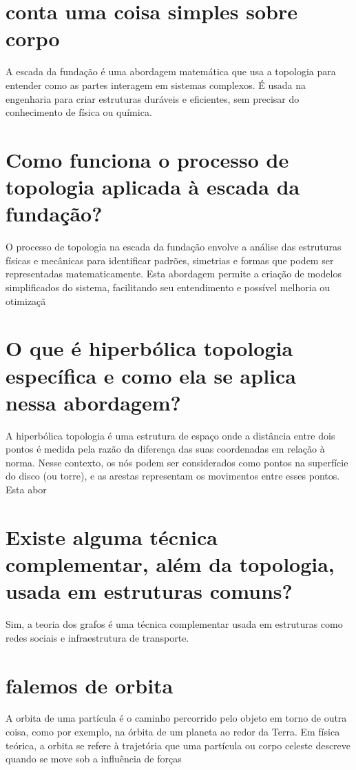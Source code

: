 \documentclass[11pt,a4paper]{article}
\begin{document}
\section{conta uma coisa simples sobre corpo}
A escada da fundação é uma abordagem matemática que usa a topologia para entender como as partes interagem em sistemas complexos. É usada na engenharia para criar estruturas duráveis e eficientes, sem precisar do conhecimento de física ou química.

\section{Como funciona o processo de topologia aplicada à escada da fundação?}
O processo de topologia na escada da fundação envolve a análise das estruturas físicas e mecânicas para identificar padrões, simetrias e formas que podem ser representadas matematicamente. Esta abordagem permite a criação de modelos simplificados do sistema, facilitando seu entendimento e possível melhoria ou otimizaçã

\section{O que é hiperbólica topologia específica e como ela se aplica nessa abordagem?}
A hiperbólica topologia é uma estrutura de espaço onde a distância entre dois pontos é medida pela razão da diferença das suas coordenadas em relação à norma. Nesse contexto, os nós podem ser considerados como pontos na superfície do disco (ou torre), e as arestas representam os movimentos entre esses pontos. Esta abor

\section{Existe alguma técnica complementar, além da topologia, usada em estruturas comuns?}
Sim, a teoria dos grafos é uma técnica complementar usada em estruturas como redes sociais e infraestrutura de transporte.

\section{falemos de orbita}
A orbita de uma partícula é o caminho percorrido pelo objeto em torno de outra coisa, como por exemplo, na órbita de um planeta ao redor da Terra. Em física teórica, a orbita se refere à trajetória que uma partícula ou corpo celeste descreve quando se move sob a influência de forças
\end{document}

